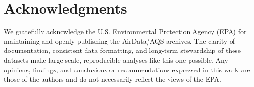 \documentclass[a4paper,fleqn]{cas-sc}
\begin{document}
\section*{Acknowledgments}
We gratefully acknowledge the U.S. Environmental Protection Agency (EPA) for maintaining and openly publishing the AirData/AQS archives. The clarity of
documentation, consistent data formatting, and long-term stewardship of these datasets make large-scale, reproducible analyses like this one possible. Any
opinions, findings, and conclusions or recommendations expressed in this work are those of the authors and do not necessarily reflect the views of the EPA.






\printcredits

%



\end{document}
